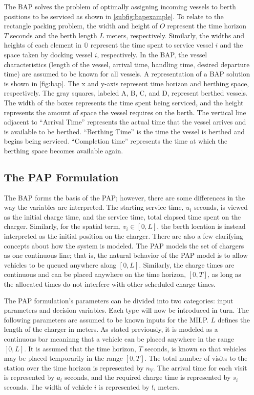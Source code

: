\documentclass[ee,thesis]{usuthesis}
\begin{document}
The BAP solves the problem of optimally assigning incoming vessels to berth positions to be serviced as shown in
\autoref{subfig:bapexample}. To relate to the rectangle packing problem, the width and height of \(O\) represent the time
horizon \(T\) seconds and the berth length \(L\) meters, respectively. Similarly, the widths and heights of each element in
\(\mathbb{O}\) represent the time spent to service vessel \(i\) and the space taken by docking vessel \(i\), respectively. In
the BAP, the vessel characteristics (length of the vessel, arrival time, handling time, desired departure time) are
assumed to be known for all vessels. A representation of a BAP solution is shown in \autoref{fig:bap}. The x and y-axis
represent time horizon and berthing space, respectively. The gray squares, labeled A, B, C, and D, represent berthed
vessels. The width of the boxes represents the time spent being serviced, and the height represents the amount of space
the vessel requires on the berth. The vertical line adjacent to ``Arrival Time'' represents the actual time that the
vessel arrives and is available to be berthed. ``Berthing Time'' is the time the vessel is berthed and begins being
serviced. ``Completion time'' represents the time at which the berthing space becomes available again.

\subsection{The PAP Formulation}
\label{sec:the-pap-formulation}
The BAP forms the basis of the PAP; however, there are some differences in the way the variables are interpreted. The
starting service time, \(u_i\) seconds, is viewed as the initial charge time, and the service time, total elapsed time
spent on the charger. Similarly, for the spatial term, \(v_i \in [0,L]\), the berth location is instead interpreted as the
initial position on the charger. There are also a few clarifying concepts about how the system is modeled. The PAP
models the set of chargers as one continuous line; that is, the natural behavior of the PAP model is to allow vehicles
to be queued anywhere along \([0,L]\). Similarly, the charge times are continuous and can be placed anywhere on the time
horizon, \([0,T]\), as long as the allocated times do not interfere with other scheduled charge times.

The PAP formulation's parameters can be divided into two categories: input parameters and decision variables. Each type
will now be introduced in turn. The following parameters are assumed to be known inputs for the MILP. \(L\) defines the
length of the charger in meters. As stated previously, it is modeled as a continuous bar meaninng that a vehicle can be
placed anywhere in the range \([0,L]\). It is assumed that the time horizon, \(T\) seconds, is known so that vehicles may be
placed temporarily in the range \([0,T]\). The total number of visits to the station over the time horizon is represented
by \(n_V\). The arrival time for each visit is represented by \(a_i\) seconds, and the required charge time is represented
by \(s_i\) seconds. The width of vehicle \(i\) is represented by \(l_i\) meters.
\end{document}
